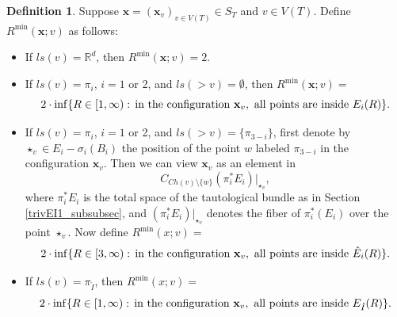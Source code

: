 \documentclass[11pt]{article}
\theoremstyle{definition}
\newtheorem{dfn}[thm]{Definition}
\theoremstyle{remark}
\def\R{\mathbb{R}}
\def\rI{{\mathring{I}}}
\def\Ch{{{Ch}}}
\def\bx{\mathbf{x}}
\def\tn#1{\textnormal{#1}}
\begin{document}
\begin{dfn}\label{Rmin_dfn}
Suppose $\bx=(\bx_v)_{v\in V(T)}\in S_T$ and $v\in V(T)$. Define $R^{\min}(\bx;v)$ as follows:
\begin{itemize}
\item 
If $ls(v)=\R^d$, then $R^{\min}(\bx;v)=2$.
\item 
If $ls(v)=\pi_i$, $i=1$ or 2, and $ls(>v)=\emptyset$, 
then $R^{\min}(\bx;v)=$
\[
2\cdot\inf\{R\in[1,\infty):\,\tn{in the configuration }\bx_v,\tn{ all points 
are inside }E_i(R)\}.
\]
\item 
If $ls(v)=\pi_i$, $i=1$ or 2, and $ls(>v)=\{\pi_{3-i}\}$, first denote by $\star_v\in E_i-\sigma_i(B_i)$ the position of the point $w$ labeled $\pi_{3-i}$ in the configuration $\bx_v$.  Then we can view $\bx_v$ as an element in 
\[
C_{\Ch(v)\setminus\{w\}}(\pi_i^*E_i)|_{\star_v},
\]
where $\pi_i^*E_i$ is the total space of 
the tautological bundle as in Section \ref{trivEI1_subsubsec}, and $(\pi_i^*E_i)|_{\star_v}$ denotes the fiber of $\pi_i^*(E_i)$ over the point $\star_v$.
Now define $R^{\min}(x;v)=$
\[
2\cdot\inf\{R\in[3,\infty):\,\tn{in the configuration }\bx_v,\tn{ all points 
are inside }\hat E_i(R)\}.
\]
\item
If $ls(v)=\pi_\rI$, then $R^{\min}(x;v)=$
$$2\cdot\inf\{R\in[1,\infty):\,\tn{in the configuration }\bx_v,\tn{ all points 
are inside }E_\rI(R)\}.$$
\end{itemize}
\end{dfn}
\end{document}
